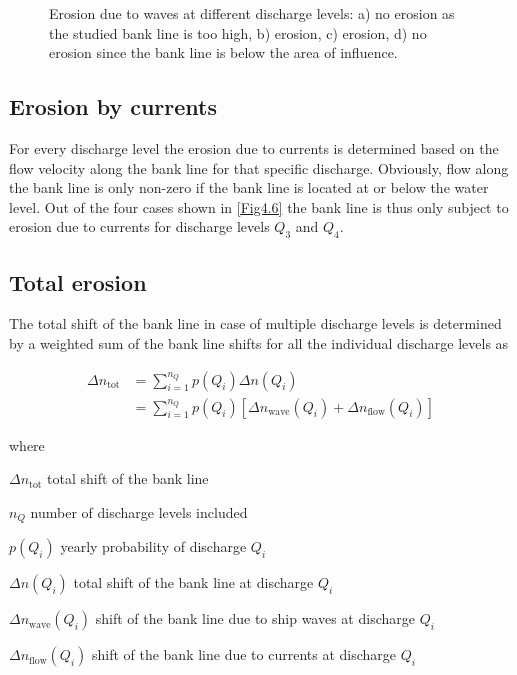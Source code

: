 \begin{figure}
\center
\resizebox{12cm}{!}{
   
}
\caption{Erosion due to waves at different discharge levels: a) no erosion as the studied bank line is too high, b) erosion, c) erosion, d) no erosion since the bank line is below the area of influence.}
\label{Fig4.6}
\end{figure}

\subsection{Erosion by currents}

For every discharge level the erosion due to currents is determined based on the flow velocity along the bank line for that specific discharge.
Obviously, flow along the bank line is only non-zero if the bank line is located at or below the water level.
Out of the four cases shown in \autoref{Fig4.6} the bank line is thus only subject to erosion due to currents for discharge levels $Q_3$ and $Q_4$.

\subsection{Total erosion}

The total shift of the bank line in case of multiple discharge levels is determined by a weighted sum of the bank line shifts for all the individual discharge levels as

\begin{align}
\Delta n_\text{tot} &= \sum_{i=1}^{n_Q} p(Q_i) \Delta n(Q_i) \\
                    &= \sum_{i=1}^{n_Q} p(Q_i) \left [ \Delta n_\text{wave}(Q_i) + \Delta n_\text{flow}(Q_i) \right ]
\label{Eq1.3}
\end{align}

where

\begin{symbollist}
\item[$\Delta n_\text{tot}$]  total shift of the bank line 
\item[$n_Q$] number of discharge levels included \unitbrackets{-}
\item[$p(Q_i)$] yearly probability of discharge $Q_i$ \unitbrackets{-}
\item[$\Delta n(Q_i)$] total shift of the bank line at discharge $Q_i$ 
\item[$\Delta n_\text{wave}(Q_i)$] shift of the bank line due to ship waves at discharge $Q_i$ 
\item[$\Delta n_\text{flow}(Q_i)$] shift of the bank line due to currents at discharge $Q_i$ 
\end{symbollist}

